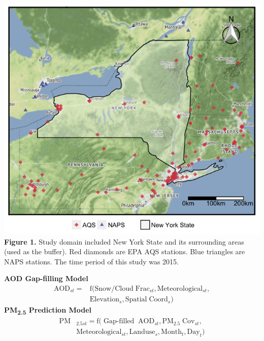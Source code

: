 \documentclass[a0paper,portrait]{baposter}
\newcommand{\tsub}{\textsubscript}
\begin{document}
\begin{poster}
{}

{
\includegraphics[width = \textwidth, height = 0.85\textwidth]{ny.jpg}
\small{\textbf{Figure 1.} Study domain included New York State and its surrounding areas (used as the buffer). Red diamonds are EPA AQS stations. Blue triangles are NAPS stations. The time period of this study was 2015.}

\vspace{0.3em}
\begin{tcolorbox}[boxsep=0pt,left=3pt,right=3pt]
\centering\textbf{AOD Gap-filling Model}
\linespread{0.8}\selectfont
\begin{align*}
\mathrm{AOD_{\mathit{st}}=}&\mathrm{f(Snow/Cloud\;Frac_{\mathit{st}}, Meteorological_{\mathit{st}},}\\
    &\mathrm{Elevation_\mathit{s}, Spatial\;Coord_\mathit{s})}
\end{align*}
\centering\textbf{PM\tsub{2.5} Prediction Model}
\begin{align*}
    \mathrm{PM}&\mathrm{_{2.5\mathit{st}}=f(\operatorname{Gap-filled}\;AOD_{\mathit{st}},PM_{2.5}\;Cov_{\mathit{st}},}\\
    &\mathrm{Meteorological_{\mathit{st}},Landuse_\mathit{s},Month_\mathit{t}, Day_\mathit{t})}
\end{align*}
\end{tcolorbox}
\vspace{0.3em}

}
\end{poster}
\end{document}
